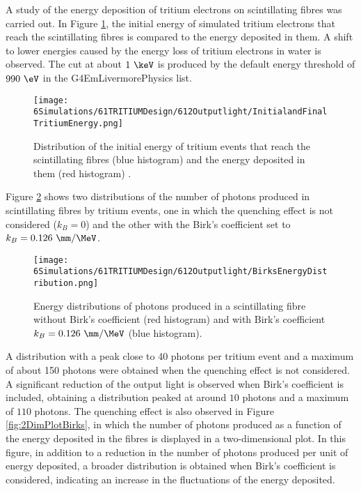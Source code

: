 A study of the energy deposition of tritium electrons on scintillating fibres was carried out. In Figure \ref{fig:InitialFinalTritiumEnergy}, the initial energy of simulated tritium electrons that reach the scintillating fibres is compared to the energy deposited in them. A shift to lower energies caused by the energy loss of tritium electrons in water is observed. The cut at about $1~\keV$ is produced by the default energy threshold of $990~\eV$ in the G4EmLivermorePhysics list.
\begin{figure}[h]
\centering
\texttt{[image: 6Simulations/61TRITIUMDesign/612Outputlight/InitialandFinalTritiumEnergy.png]}
\caption{Distribution of the initial energy of tritium events that reach the scintillating fibres (blue histogram) and the energy deposited in them (red histogram) \cite{SimulationPaperCarlos}.\label{fig:InitialFinalTritiumEnergy}}
\end{figure}
Figure \ref{fig:BirksEffectinEnergyDistribution} shows two distributions of the number of photons produced in scintillating fibres by tritium events, one in which the quenching effect is not considered ($k_B=0$) and the other with the Birk's coefficient set to $k_B=0.126~\mm/\MeV$.
\begin{figure}[h]
\centering
\texttt{[image: 6Simulations/61TRITIUMDesign/612Outputlight/BirksEnergyDistribution.png]}
\caption{Energy distributions of photons produced in a scintillating fibre without Birk's coefficient (red histogram) and with Birk's coefficient $k_B=0.126~\mm/\MeV$ (blue histogram)\cite{SimulationPaperCarlos}.\label{fig:BirksEffectinEnergyDistribution}}
\end{figure}  
A distribution with a peak close to 40 photons per tritium event and a maximum of about 150 photons were obtained when the quenching effect is not considered. A significant reduction of the output light is observed when Birk's coefficient is included, obtaining a distribution peaked at around $10$ photons and a maximum of $110$ photons. The quenching effect is also observed in Figure \ref{fig:2DimPlotBirks}, in which the number of photons produced  as a function of the energy deposited in the fibres is displayed in a two-dimensional plot. In this figure, in addition to a reduction in the number of photons produced per unit of energy deposited, a broader distribution is obtained when Birk's coefficient is considered, indicating an increase in the fluctuations of the energy deposited.

